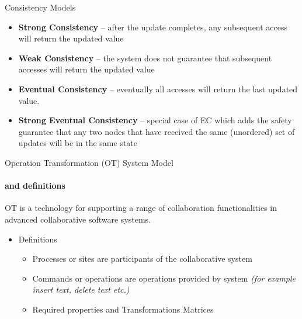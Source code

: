 \documentclass{beamer}
\begin{document}
\begin{frame}{Consistency Models}

\begin{itemize}
 	\item \textbf{Strong Consistency} – after the update completes, any subsequent access will return the updated value
	\item \textbf{Weak Consistency} – the system does not guarantee that subsequent accesses will return the updated value
	\item \textbf{Eventual Consistency} – eventually all accesses will return the last updated value.
	\item \textbf{Strong Eventual Consistency} – special case of EC which adds the safety guarantee that any two nodes that have received the same (unordered) set of updates will be in the same state
\end{itemize}

\end{frame}

\begin{frame}{Operation Transformation (OT) System Model}
\framesubtitle{and definitions}

\begin{block}{OT}
is a technology for supporting a range of collaboration functionalities in advanced collaborative software systems.	
\end{block}
\vspace{0.5cm}
\begin{itemize}
	
  \item Definitions
  \begin{itemize}
    \item Processes or sites are participants of the collaborative system
    \item Commands or operations are operations provided by system \textit{(for example insert text, delete text etc.)}
    \item Required properties and Transformations Matrices
  \end{itemize}     
\end{itemize}
\end{frame}
\end{document}

